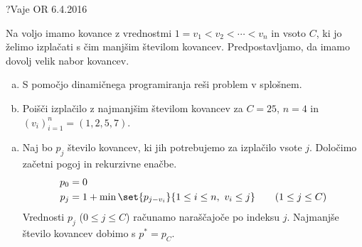 \begin{naloga}{?}{Vaje OR 6.4.2016}
\begin{vprasanje}
Na voljo imamo kovance z vrednostmi $1 = v_1 < v_2 < \cdots < v_n$
in vsoto $C$, ki jo želimo izplačati s čim manjšim številom kovancev.
Predpostavljamo, da imamo dovolj velik nabor kovancev.
\begin{enumerate}[(a)]
\item S pomočjo dinamičnega programiranja reši problem v splošnem.
\item Poišči izplačilo z najmanjšim številom kovancev
za $C = 25$, $n = 4$ in $(v_i)_{i=1}^n = (1, 2, 5, 7)$.
\end{enumerate}
\end{vprasanje}

\begin{odgovor}
\begin{enumerate}[(a)]
\item Naj bo $p_j$ število kovancev,
ki jih potrebujemo za izplačilo vsote $j$.
Določimo začetni pogoj in rekurzivne enačbe.
\begin{align*}
p_0 &= 0 \\
p_j &= 1 + \min\set{p_{j-v_i}}{1 \le i \le n, \ v_i \le j}
\qquad (1 \le j \le C)
\end{align*}
Vrednosti $p_j$ ($0 \le j \le C$) računamo naraščajoče po indeksu $j$.
Najmanjše število kovancev dobimo s $p^* = p_C$.


\end{enumerate}
\end{odgovor}
\end{naloga}
